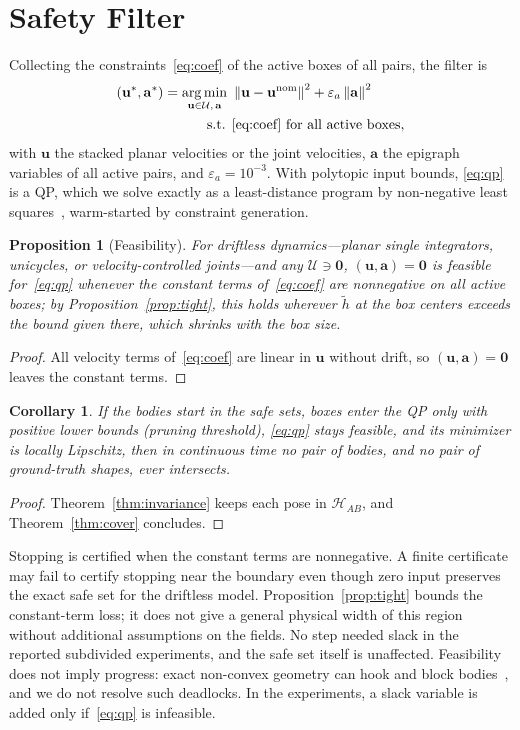 \documentclass[journal]{IEEEtran}
\newtheorem{proposition}{Proposition}
\newtheorem{corollary}{Corollary}
\theoremstyle{definition}
\newcommand{\norm}[1]{\left\lVert #1\right\rVert}
\DeclareMathOperator*{\argmin}{arg\,min}
\begin{document}
\section{Safety Filter}\label{sec:filter}
Collecting the constraints~\eqref{eq:coef} of the active boxes of all pairs, the filter is
\begin{equation}\label{eq:qp}
\begin{aligned}
(\mathbf u^\ast,\mathbf a^\ast)=\argmin_{\mathbf u\in\mathcal U,\,\mathbf a}\ &\norm{\mathbf u-\mathbf u^{\rm nom}}^2+\varepsilon_a\norm{\mathbf a}^2\\
\text{s.t. }&\eqref{eq:coef}\ \text{for all active boxes},
\end{aligned}
\end{equation}
with $\mathbf u$ the stacked planar velocities or the joint velocities, $\mathbf a$ the epigraph
variables of all active pairs, and $\varepsilon_a=10^{-3}$. With
polytopic input bounds, \eqref{eq:qp} is a QP, which we solve exactly as a least-distance program by
non-negative least squares~\cite{lawson1995solving}, warm-started by constraint generation.
\begin{proposition}[Feasibility]\label{prop:feas}
For driftless dynamics---planar single integrators, unicycles, or velocity-controlled joints---and
any $\mathcal U\ni\mathbf 0$, $(\mathbf u,\mathbf a)=\mathbf 0$ is feasible for~\eqref{eq:qp} whenever
the constant terms of~\eqref{eq:coef} are nonnegative on all active boxes; by
Proposition~\ref{prop:tight}, this holds wherever $\tilde h$ at the box centers exceeds the bound given
there, which shrinks with the box size.
\end{proposition}
\begin{proof}
All velocity terms of~\eqref{eq:coef} are linear in $\mathbf u$ without drift, so
$(\mathbf u,\mathbf a)=\mathbf 0$ leaves the constant terms.
\end{proof}
\begin{corollary}\label{cor:closed}
If the bodies start in the safe sets, boxes enter the QP only with positive lower bounds (pruning
threshold), \eqref{eq:qp} stays feasible, and its minimizer is locally Lipschitz, then in continuous
time no pair of bodies, and no pair of ground-truth shapes, ever intersects.
\end{corollary}
\begin{proof}
Theorem~\ref{thm:invariance} keeps each pose in $\mathcal H_{AB}$, and Theorem~\ref{thm:cover}
concludes.
\end{proof}
Stopping is certified when the constant terms are nonnegative. A finite certificate may fail to
certify stopping near the boundary even though zero input preserves the exact safe set for the
driftless model. Proposition~\ref{prop:tight} bounds the constant-term loss; it does not give a
general physical width of this region without additional assumptions on the fields.
No step needed slack in the reported subdivided experiments, and the safe set itself is unaffected.
Feasibility does not imply progress: exact non-convex geometry can hook and block
bodies~\cite{reis2020undesirable}, and we do not resolve such deadlocks. In the experiments, a slack
variable is added only if~\eqref{eq:qp} is infeasible.
\end{document}
